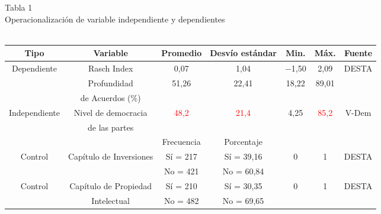 \documentclass[a4paper]{tufte-handout}
\begin{document}

\begin{table}[h]
  \centering
  \selectfont
   \smallskip\noindent\small Tabla 1 \\ Operacionalización de variable independiente y dependientes \\~\\
  \begin{tabular}{c c c c c c c}
    \toprule
    Tipo & Variable & Promedio & Desvío estándar & Min. & Máx. & Fuente \\
    \midrule
    \multirow{3}{*}{Dependiente} & Rasch Index & 0,07 & 1,04 & $-$1,50 & 2,09 & \multirow{3}{*}{DESTA} \\ 
     & Profundidad & \multirow{2}{*}{51,26} & \multirow{2}{*}{22,41} & \multirow{2}{*}{18,22} & \multirow{2}{*}{89,01} & \\ 
     & de Acuerdos (\%) & & & & & \\ \midrule
    \multirow{2}{*}{Independiente} & Nivel de democracia & \multirow{2}{*}{\textcolor{red}{48,2}} & \multirow{2}{*}{\textcolor{red}{21,4}} & \multirow{2}{*}{4,25} & \multirow{2}{*}{\textcolor{red}{85,2}} & \multirow{2}{*}{V-Dem} \\
    & de las partes & & & & & \\ \midrule
    & & Frecuencia	& Porcentaje & & & \\ \midrule
    \multirow{2}{*}{Control} & \multirow{2}{*}{Capítulo de Inversiones} & Sí = 217 & Sí = 39,16 & \multirow{2}{*}{0} & \multirow{2}{*}{1} & \multirow{2}{*}{DESTA} \\ 
    & & No = 421 & No = 60,84 & & & \\ \midrule
    \multirow{2}{*}{Control} & Capítulo de Propiedad & Sí = 210 & Sí = 30,35 & \multirow{2}{*}{0} & \multirow{2}{*}{1} & \multirow{2}{*}{DESTA} \\ 
    & Intelectual & No = 482 & No = 69,65 & & & \\ \midrule

\end{tabular}
\end{table}
\end{document}
